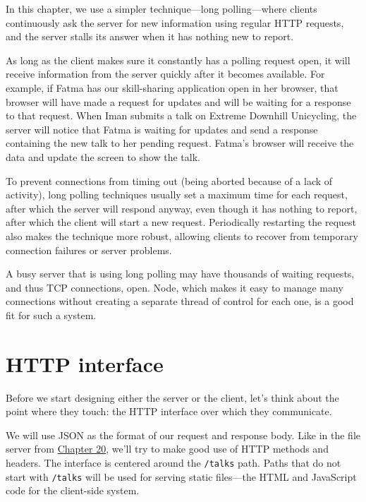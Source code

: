 In this chapter, we use a simpler technique—long polling—where clients continuously ask the server for new information using regular HTTP requests, and the server stalls its answer when it has nothing new to report.

As long as the client makes sure it constantly has a polling request open, it will receive information from the server quickly after it becomes available. For example, if Fatma has our skill-sharing application open in her browser, that browser will have made a request for updates and will be waiting for a response to that request. When Iman submits a talk on Extreme Downhill Unicycling, the server will notice that Fatma is waiting for updates and send a response containing the new talk to her pending request. Fatma's browser will receive the data and update the screen to show the talk.

To prevent connections from timing out (being aborted because of a lack of activity), long polling techniques usually set a maximum time for each request, after which the server will respond anyway, even though it has nothing to report, after which the client will start a new request. Periodically restarting the request also makes the technique more robust, allowing clients to recover from temporary connection failures or server problems.

A busy server that is using long polling may have thousands of waiting requests, and thus TCP connections, open. Node, which makes it easy to manage many connections without creating a separate thread of control for each one, is a good fit for such a system.

\section{HTTP interface}

Before we start designing either the server or the client, let's think about the point where they touch: the HTTP interface over which they communicate.

We will use JSON as the format of our request and response body. Like in the file server from \hyperref[node.file_server]{Chapter 20}, we'll try to make good use of HTTP methods and headers. The interface is centered around the \lstinline`/talks` path. Paths that do not start with \lstinline`/talks` will be used for serving static files—the HTML and JavaScript code for the client-side system.

